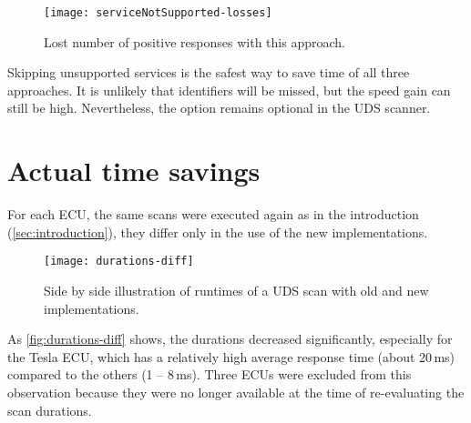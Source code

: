 \begin{figure}[htb]
    \centering
    \texttt{[image: serviceNotSupported-losses]}
    \caption{Lost number of positive responses with this approach.}
    \label{fig:serviceNotSupported-losses}
\end{figure}

Skipping unsupported services is the safest way to save time of all three approaches. It is unlikely that identifiers will be missed, but the speed gain can still be high. Nevertheless, the option remains optional in the UDS scanner.

\section{Actual time savings}

For each ECU, the same scans were executed again as in the introduction (\autoref{sec:introduction}), they differ only in the use of the new implementations.

\begin{figure}[htb]
    \centering
    \texttt{[image: durations-diff]}
    \caption{Side by side illustration of runtimes of a UDS scan with old and new implementations.}
    \label{fig:durations-diff}
\end{figure}

As \autoref{fig:durations-diff} shows, the durations decreased significantly, especially for the Tesla ECU, which has a relatively high average response time (about 20\,ms) compared to the others (1 – 8\,ms).
Three ECUs were excluded from this observation because they were no longer available at the time of re-evaluating the scan durations.
